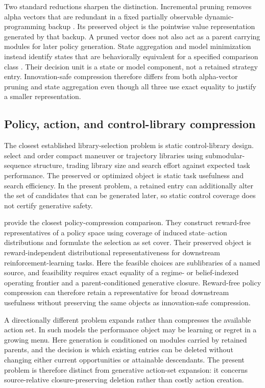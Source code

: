 Two standard reductions sharpen the distinction. Incremental pruning removes
alpha vectors that are redundant in a fixed partially observable dynamic-
programming backup \citep{CassandraLittmanZhang1997}. Its preserved object is
the pointwise value representation generated by that backup. A pruned vector
does not also act as a parent carrying modules for later policy generation.
State aggregation and model minimization instead identify states that are
behaviorally equivalent for a specified comparison class
\citep{GivanDeanGreig2003}. Their decision unit is a state or model component,
not a retained strategy entry. Innovation-safe compression therefore differs
from both alpha-vector pruning and state aggregation even though all three use
exact equality to justify a smaller representation.

\subsection{Policy, action, and control-library compression}

The closest established library-selection problem is static control-library
design. \citet{DeyEtAl2012} select and order compact maneuver or trajectory
libraries using submodular-sequence structure, trading library size and search
effort against expected task performance. The preserved or optimized object is
static task usefulness and search efficiency. In the present problem, a
retained entry can additionally alter the set of candidates that can be
generated later, so static control coverage does not certify generative
safety.

\citet{MuttiDelColRestelli2022} provide the closest policy-compression
comparison. They construct reward-free representatives of a policy space using
coverage of induced state--action distributions and formulate the selection as
set cover. Their preserved object is reward-independent distributional
representativeness for downstream reinforcement-learning tasks. Here the
feasible choices are sublibraries of a named source, and feasibility requires
exact equality of a regime- or belief-indexed operating frontier and a
parent-conditioned generative closure. Reward-free policy compression can
therefore retain a representative for broad downstream usefulness without
preserving the same objects as innovation-safe compression.

A directionally different problem expands rather than compresses the available
action set. In such models the performance object may be learning or regret in
a growing menu. Here generation is conditioned on modules carried by retained
parents, and the decision is which existing entries can be deleted without
changing either current opportunities or attainable descendants. The present
problem is therefore distinct from generative action-set expansion: it concerns
source-relative closure-preserving deletion rather than costly action creation.

